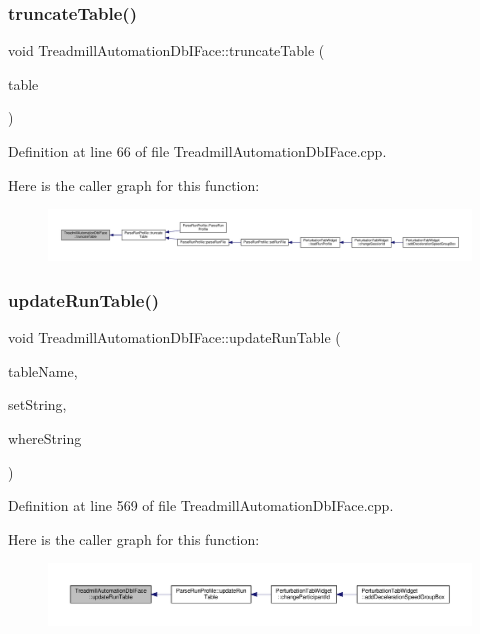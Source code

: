 \subsubsection{\texorpdfstring{truncate\+Table()}{truncateTable()}}
{\footnotesize\ttfamily void Treadmill\+Automation\+Db\+I\+Face\+::truncate\+Table (\begin{DoxyParamCaption}\item[{Q\+String}]{table }\end{DoxyParamCaption})}



Definition at line 66 of file Treadmill\+Automation\+Db\+I\+Face.\+cpp.

Here is the caller graph for this function\+:
\nopagebreak
\begin{figure}[H]
\begin{center}
\leavevmode
\includegraphics[width=350pt]{class_treadmill_automation_db_i_face_a806259743506350c3152586229e741bd_icgraph}
\end{center}
\end{figure}
\mbox{\label{class_treadmill_automation_db_i_face_a3257a5cace0f0f7e2094572c601f638a}} 
\subsubsection{\texorpdfstring{update\+Run\+Table()}{updateRunTable()}}
{\footnotesize\ttfamily void Treadmill\+Automation\+Db\+I\+Face\+::update\+Run\+Table (\begin{DoxyParamCaption}\item[{Q\+String}]{table\+Name,  }\item[{Q\+String}]{set\+String,  }\item[{Q\+String}]{where\+String }\end{DoxyParamCaption})}



Definition at line 569 of file Treadmill\+Automation\+Db\+I\+Face.\+cpp.

Here is the caller graph for this function\+:
\nopagebreak
\begin{figure}[H]
\begin{center}
\leavevmode
\includegraphics[width=350pt]{class_treadmill_automation_db_i_face_a3257a5cace0f0f7e2094572c601f638a_icgraph}
\end{center}
\end{figure}


